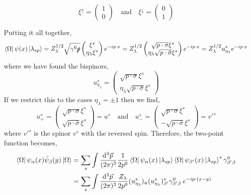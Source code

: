 \documentclass[12pt]{article}
\begin{document}
\[ \xi^{\uparrow} = 
\begin{pmatrix}
1 \\
0
\end{pmatrix}
\quad \text{and} \quad 
\xi^{\downarrow} = 
\begin{pmatrix}
0 \\
1
\end{pmatrix}\]

Putting it all together, 
\[  \left< \Omega \right| \psi(x) \left| \lambda_{s p} \right> = Z_{\lambda}^{1/2} \sqrt{ \gamma^0 \slashed{p}}  \begin{pmatrix}
\xi^s \\
\eta_\lambda \xi^s
\end{pmatrix} e^{- i p \cdot x} = Z_{\lambda}^{1/2} 
\begin{pmatrix}
\sqrt{p \cdot \sigma} \xi^s \\
\eta_\lambda \sqrt{p \cdot \bar{\sigma}} \xi^s
\end{pmatrix} 
e^{- i p \cdot x} = Z_{\lambda}^{1/2} u^s_{\eta_\lambda} e^{ -i p \cdot x} \]
where we have found the bispinors,
\[ u^s_{\eta_\lambda} = 
\begin{pmatrix}
\sqrt{p \cdot \sigma} \xi^s \\
\eta_\lambda \sqrt{p \cdot \bar{\sigma}} \xi^s
\end{pmatrix}  \]
If we restrict this to the cases $\eta_\lambda = \pm 1$ then we find,
\[ u^s_{+} = 
\begin{pmatrix}
\sqrt{p \cdot \sigma} \xi^s \\
\sqrt{p \cdot \bar{\sigma}} \xi^s
\end{pmatrix} 
= u^s \quad \text{and} \quad
u^s_{-} = 
\begin{pmatrix}
\sqrt{p \cdot \sigma} \xi^s \\
- \sqrt{p \cdot \bar{\sigma}} \xi^s
\end{pmatrix}
= v'^{s} \]
where $v'^{s}$ is the spinor $v^s$ with the reversed spin. Therefore, the two-point function becomes,
\begin{align*}
\left< \Omega \right| \psi_{\alpha}(x) \bar{\psi}_{\beta}(y) \left| \Omega \right> &= \sum_{s} \int \frac{\mathrm{d}^{3} \vec{p} \:}{(2 \pi)^3} \frac{1}{2 p^0} \left< \Omega \right| \psi_{\alpha}(x) \left| \lambda_{s p} \right>  \left< \Omega \right| \psi_{\beta'}(x) \left| \lambda_{s p} \right>^* \gamma^0_{\beta' \beta}
\\
& = \sum_{s} \int \frac{\mathrm{d}^{3} \vec{p} \:}{(2 \pi)^3} \frac{Z_{\lambda}}{2 p^0} (u^s_{\eta_\lambda})_{\alpha} (u^s_{\eta_\lambda})_{\beta'}^* \gamma^0_{\beta' \beta} \: e^{- i p \cdot (x - y) }
\end{align*}
\end{document}
